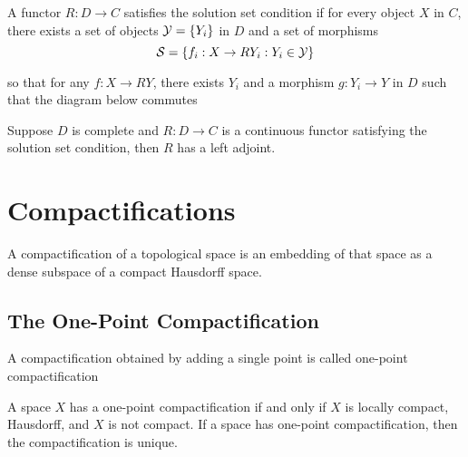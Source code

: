 \documentclass{article}
\begin{document}
\begin{definition}
    A functor $R: D \to C$ satisfies the solution set condition if for every object $X$ in $C$, there exists a set of objects $\mathcal{Y} = \{Y_i\}$ in $D$ and a set of morphisms
    $$
        \mathcal{S} = \{f_i: X \to RY_i: Y_i \in \mathcal{Y}\}
    $$

    so that for any $f: X \to RY$, there exists $Y_i$ and a morphism $g: Y_i \to Y$ in $D$ such that the diagram below commutes

    \begin{center}
    \end{center}
\end{definition}

\begin{theorem}
    Suppose $D$ is complete and $R: D \to C$ is a continuous functor satisfying the solution set condition, then $R$ has a left adjoint.
\end{theorem}

\section{Compactifications}

\begin{definition}[compactification]
    A compactification of a topological space is an embedding of that space as a dense subspace of a compact Hausdorff space.
\end{definition}

\subsection{The One-Point Compactification}

\begin{definition}
    A compactification obtained by adding a single point is called one-point compactification
\end{definition}

\begin{proposition}
    A space $X$ has a one-point compactification if and only if $X$ is locally compact, Hausdorff, and $X$ is not compact. If a space has one-point compactification, then the compactification is unique.
\end{proposition}
\end{document}
